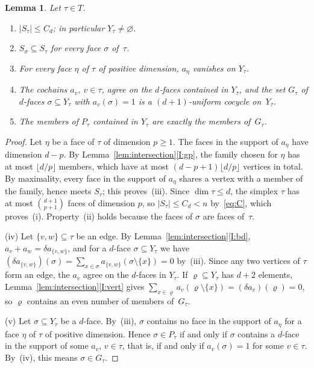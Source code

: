 \documentclass[11pt]{article}
\newtheorem{lemma}[theorem]{Lemma}
\theoremstyle{definition}
\numberwithin{equation}{section}
\begin{document}
\begin{lemma}\label{lem:covers}
Let $\tau\in T$.
\begin{enumerate}[label=\textup{(\roman*)}]
\item $|S_\tau|\le C_d$; in particular $Y_\tau\ne\varnothing$.
\item $S_\sigma\subseteq S_\tau$ for every face $\sigma$ of~$\tau$.
\item For every face $\eta$ of $\tau$ of positive dimension, $a_\eta$ vanishes on $Y_\tau$.
\item The cochains $a_v$, $v\in\tau$, agree on the $d$-faces contained in $Y_\tau$, and the set $G_\tau$ of $d$-faces $\sigma\subseteq Y_\tau$ with $a_v(\sigma)=1$ is a $(d+1)$-uniform cocycle on~$Y_\tau$.
\item The members of $P_\tau$ contained in $Y_\tau$ are exactly the members of~$G_\tau$.
\end{enumerate}
\end{lemma}
\begin{proof}
Let $\eta$ be a face of $\tau$ of dimension $p\ge1$. The faces in the support of $a_\eta$ have dimension $d-p$. By Lemma~\ref{lem:intersection}\ref{I:gp}, the family chosen for $\eta$ has at most $\lfloor d/p\rfloor$ members, which have at most $(d-p+1)\lfloor d/p\rfloor$ vertices in total. By maximality, every face in the support of $a_\eta$ shares a vertex with a member of the family, hence meets $S_\tau$; this proves~(iii). Since $\dim\tau\le d$, the simplex $\tau$ has at most $\binom{d+1}{p+1}$ faces of dimension $p$, so $|S_\tau|\le C_d<n$ by~\eqref{eq:C}, which proves~(i). Property~(ii) holds because the faces of $\sigma$ are faces of~$\tau$.

(iv) Let $\{v,w\}\subseteq\tau$ be an edge. By Lemma~\ref{lem:intersection}\ref{I:bd}, $a_v+a_w=\delta a_{\{v,w\}}$, and for a $d$-face $\sigma\subseteq Y_\tau$ we have $(\delta a_{\{v,w\}})(\sigma)=\sum_{x\in\sigma}a_{\{v,w\}}(\sigma\setminus\{x\})=0$ by~(iii). Since any two vertices of $\tau$ form an edge, the $a_v$ agree on the $d$-faces in $Y_\tau$. If $\varrho\subseteq Y_\tau$ has $d+2$ elements, Lemma~\ref{lem:intersection}\ref{I:vert} gives $\sum_{x\in\varrho}a_v(\varrho\setminus\{x\})=(\delta a_v)(\varrho)=0$, so $\varrho$ contains an even number of members of~$G_\tau$.

(v) Let $\sigma\subseteq Y_\tau$ be a $d$-face. By~(iii), $\sigma$ contains no face in the support of $a_\eta$ for a face $\eta$ of $\tau$ of positive dimension. Hence $\sigma\in P_\tau$ if and only if $\sigma$ contains a $d$-face in the support of some $a_v$, $v\in\tau$, that is, if and only if $a_v(\sigma)=1$ for some $v\in\tau$. By~(iv), this means $\sigma\in G_\tau$.
\end{proof}
\end{document}
